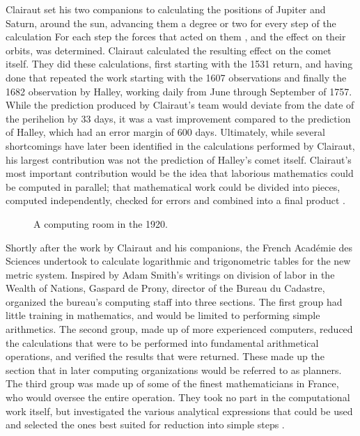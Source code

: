 \documentclass[\rootfolder/main.tex]{subfiles}
\begin{document}
Clairaut set his two companions to calculating the positions of Jupiter and Saturn, around the sun, advancing them a degree or two for every step of the calculation
For each step the forces that acted on them , and the effect on their orbits, was determined.
Clairaut calculated the resulting effect on the comet itself.
They did these calculations, first starting with the 1531 return, and having done that repeated the work starting with the 1607 observations and finally the 1682 observation by Halley,
working daily from June through September of 1757.
While the prediction produced by Clairaut's team would deviate from the date of the perihelion by 33 days, it was a vast improvement compared to the prediction of Halley, which had an error margin of 600 days.
Ultimately, while several shortcomings have later been identified in the calculations performed by Clairaut, his largest contribution was not the prediction of Halley's comet itself.
Clairaut's most important contribution would be the idea that laborious mathematics could be computed in parallel;
that mathematical work could be divided into pieces, computed independently, checked for errors and combined into a final product \cite{grier1955}.

\begin{figure}[h]
    \caption{A computing room in the 1920.}
    \label{fig:tabulatingroom}
\end{figure}

Shortly after the work by Clairaut and his companions, the French Académie des Sciences undertook to calculate logarithmic and trigonometric tables for the new metric system.
Inspired by Adam Smith's writings on division of labor in the Wealth of Nations, Gaspard de Prony, director of the Bureau du Cadastre, organized the bureau's computing staff into three sections.
The first group had little training in mathematics, and would be limited to performing simple arithmetics.
The second group, made up of more experienced computers, reduced the calculations that were to be performed into fundamental arithmetical operations, and verified the results that were returned.
These made up the section that in later computing organizations would be referred to as planners.
The third group was made up of some of the finest mathematicians in France, who would oversee the entire operation.
They took no part in the computational work itself, but investigated the various analytical expressions that could be used and selected the ones best suited for reduction into simple steps \cite{hyman1985}.
\end{document}
